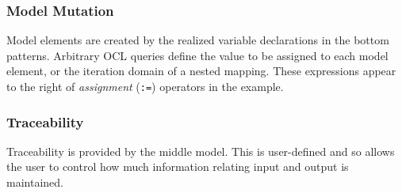 \subsubsection{Model Mutation}
Model elements are created by the realized variable declarations in the bottom patterns. Arbitrary OCL queries define the value to be assigned to each model element, or the iteration domain of a nested mapping. These expressions appear to the right of \textit{assignment} (\texttt{:=}) operators in the example.

\subsubsection{Traceability}
Traceability is provided by the middle model. This is user-defined and so allows the user to control how much information relating input and output is maintained.





